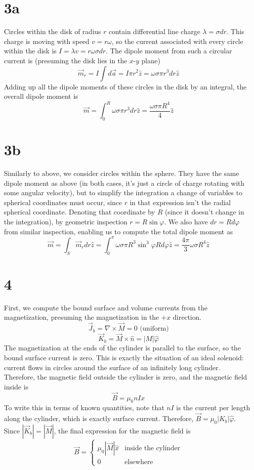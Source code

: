 \documentclass{article}
\begin{document}
\section*{3a}
Circles within the disk of radius $r$ contain differential line charge $\lambda=\sigma dr$. This charge is moving with speed $v=r\omega$, so the current associated with every circle within the disk is $I=\lambda v=r\omega\sigma dr$. The dipole moment from such a circular current is (presuming the disk lies in the $x$-$y$ plane)
\[\vec{m}_r=I\int d\vec{a}=I\pi r^2\hat{z}=\omega\sigma \pi r^3dr\hat{z}\]
Adding up all the dipole moments of these circles in the disk by an integral, the overall dipole moment is
\[\vec{m}=\int_0^R\omega\sigma\pi r^3dr\hat{z}=\frac{\omega\sigma\pi R^4}{4}\hat{z}\]

\section*{3b}
Similarly to above, we consider circles within the sphere. They have the same dipole moment as above (in both cases, it's just a circle of charge rotating with some angular velocity), but to simplify the integration a change of variables to spherical coordinates must occur, since $r$ in that expression isn't the radial spherical coordinate. Denoting that coordinate by $R$ (since it doesn't change in the integration), by geometric inspection $r=R\sin\varphi$. We also have $dr=Rd\varphi$ from similar inspection, enabling us to compute the total dipole moment as
\[\vec{m}=\int_S\vec{m}_rdr\hat{z}=\int_{0}^{\pi}\omega\sigma\pi R^3\sin^3\varphi Rd\varphi\hat{z}=\frac{4\pi}{3}\omega\sigma R^4\hat{z}\]

\section*{4}
First, we compute the bound surface and volume currents from the magnetization, presuming the magnetization in the $+x$ direction.
\[\vec{J}_b=\nabla\times \vec{M}=0 \textrm{ (uniform)}\]
\[\vec{K}_b=\vec{M}\times \hat{n}=|M|\hat{\varphi}\]
The magnetization at the ends of the cylinder is parallel to the surface, so the bound surface current is zero.
This is exactly the situation of an ideal solenoid: current flows in circles around the surface of an infinitely long cylinder.
Therefore, the magnetic field outside the cylinder is zero, and the magnetic field inside is
\[\vec{B}=\mu_0nI\hat{x}\]
To write this in terms of known quantities, note that $nI$ is the current per length along the cylinder, which is exactly surface current. Therefore, $\vec{B}=\mu_0|K_b|\hat{\varphi}$.
Since $|\vec{K}_b|=|\vec{M}|$, the final expression for the magnetic field is
\[\vec{B}=\begin{cases}
    {\mu_0|\vec{M}|}\hat{x} & \textrm{inside the cylinder} \\
    0 & \textrm{elsewhere}
  \end{cases}\]
\end{document}
